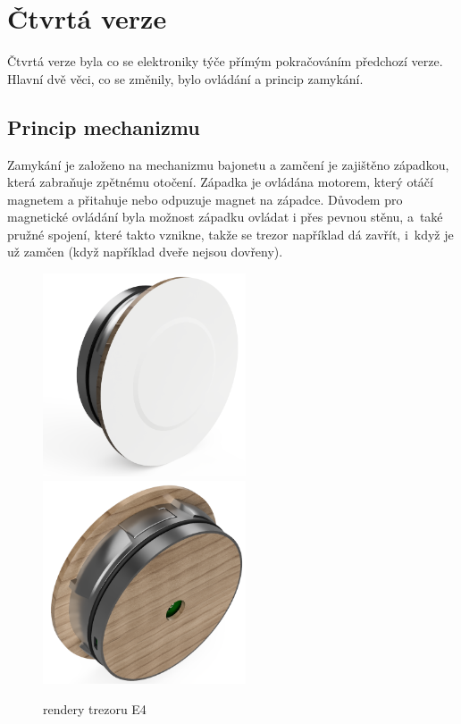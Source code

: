 \section{Čtvrtá verze}

Čtvrtá verze byla co se elektroniky týče přímým pokračováním předchozí verze. 
Hlavní dvě věci, co se změnily, bylo ovládání a princip zamykání. 

\subsection*{Princip mechanizmu}

Zamykání je založeno na mechanizmu bajonetu a zamčení je zajištěno západ\-kou, která zabraňuje zpětnému otočení.
Západka je ovládána motorem, který otáčí magnetem a přitahuje nebo odpuzuje magnet na západce. Důvodem pro magnetické ovládání
byla možnost západku ovládat i přes pevnou stěnu, a~také pružné spojení, které takto vznikne, takže se trezor například dá zavřít, i~když
je už zamčen (když například dveře nejsou dovřeny).

\begin{figure}[htbp]
    \centering
    \includegraphics[width=170pt]{kapitoly/obrazky/E4/predni_render.png}
    \includegraphics[width=170pt]{kapitoly/obrazky/E4/zadni_render.png}
    \caption{rendery trezoru E4}
    \label{fig:E4-render}
\end{figure}

